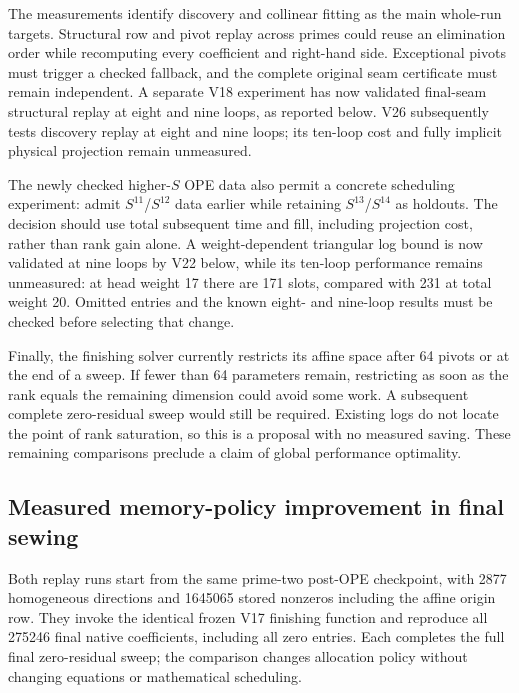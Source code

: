 \documentclass[11pt]{article}
\begin{document}
The measurements identify discovery and collinear fitting as the main
whole-run targets. Structural row and pivot replay across primes could reuse
an elimination order while recomputing every coefficient and right-hand
side. Exceptional pivots must trigger a checked fallback, and the complete
original seam certificate must remain independent. A separate V18 experiment
has now validated final-seam structural replay at eight and nine loops, as
reported below. V26 subsequently tests discovery replay at eight and nine
loops; its ten-loop cost and fully implicit physical projection remain
unmeasured.

The newly checked higher-$S$ OPE data also permit a concrete scheduling
experiment: admit $S^{11}$/$S^{12}$ data earlier while retaining
$S^{13}$/$S^{14}$ as holdouts. The decision should use total subsequent time
and fill, including projection cost, rather than rank gain alone. A weight-dependent triangular log bound is now validated at nine loops by
V22 below, while its ten-loop performance remains unmeasured:
at head weight 17 there are 171 slots, compared with 231 at total weight 20.
Omitted entries and the known eight- and nine-loop results must be checked
before selecting that change.

Finally, the finishing solver currently restricts its affine space after
64 pivots or at the end of a sweep. If fewer than 64 parameters remain,
restricting as soon as the rank equals the remaining dimension could avoid
some work. A subsequent complete zero-residual sweep would still be required.
Existing logs do not locate the point of rank saturation, so this is a
proposal with no measured saving. These remaining comparisons preclude a
claim of global performance optimality.

\subsection{Measured memory-policy improvement in final sewing}
Both replay runs start from the same prime-two post-OPE checkpoint, with
2877 homogeneous directions and 1645065 stored nonzeros including the affine
origin row. They invoke the identical frozen V17 finishing function and
reproduce all 275246 final native coefficients, including all zero entries.
Each completes the full final zero-residual sweep; the comparison changes
allocation policy without changing equations or mathematical scheduling.
\end{document}
